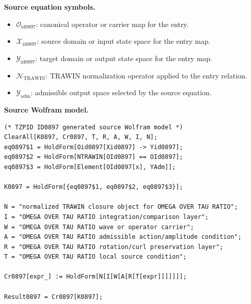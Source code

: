 \begin{minipage}[t]{0.49\linewidth}
\begingroup
\small
\raggedright
\textbf{Source equation symbols.}\par
\begin{itemize}[leftmargin=1.35em,itemsep=1pt,topsep=1pt,parsep=0pt]
    \item $\mathcal{O}_{\mathrm{id0897}}$: canonical operator or carrier map for the entry.
    \item $\mathcal{X}_{\mathrm{id0897}}$: source domain or input state space for the entry map.
    \item $\mathcal{Y}_{\mathrm{id0897}}$: target domain or output state space for the entry map.
    \item $\mathcal{N}_{\mathrm{TRAWIN}}$: TRAWIN normalization operator applied to the entry relation.
    \item $\mathcal{Y}_{\mathrm{adm}}$: admissible output space selected by the source equation.
\end{itemize}
\endgroup
\end{minipage}\hfill
\begin{minipage}[t]{0.47\linewidth}
\begingroup
\scriptsize
\raggedright
\textbf{Source Wolfram model.}\par
\begin{Verbatim}[fontsize=\tiny,breaklines=true,breakanywhere=true]
(* TZPID ID0897 generated source Wolfram model *)
ClearAll[K0897, Cr0897, T, R, A, W, I, N];
eq0897$1 = HoldForm[Oid0897[Xid0897] -> Yid0897];
eq0897$2 = HoldForm[NTRAWIN[OId0897] == OId0897];
eq0897$3 = HoldForm[Element[OId0897[x], YAdm]];

K0897 = HoldForm[{eq0897$1, eq0897$2, eq0897$3}];

N = "normalized TRAWIN closure object for OMEGA OVER TAU RATIO";
I = "OMEGA OVER TAU RATIO integration/comparison layer";
W = "OMEGA OVER TAU RATIO wave or operator carrier";
A = "OMEGA OVER TAU RATIO admissible action/amplitude condition";
R = "OMEGA OVER TAU RATIO rotation/curl preservation layer";
T = "OMEGA OVER TAU RATIO local source condition";

Cr0897[expr_] := HoldForm[N[I[W[A[R[T[expr]]]]]]];

Result0897 = Cr0897[K0897];
\end{Verbatim}
\endgroup
\end{minipage}

